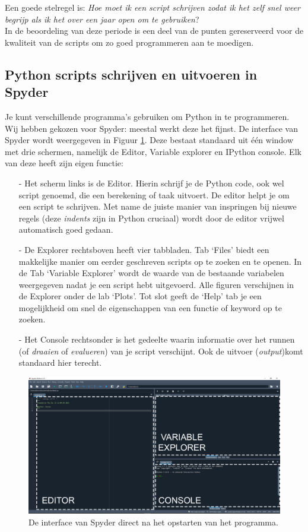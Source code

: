 \documentclass[a4paper,11pt, fleqn]{article}
\begin{document}
Een goede stelregel is: \textit{Hoe moet ik een script schrijven zodat ik het zelf snel weer begrijp als ik het over een jaar open om te gebruiken}? \\
In de beoordeling van deze periode is een deel van de punten gereserveerd voor de kwaliteit van de scripts om zo goed programmeren aan te moedigen.

\subsection{Python scripts schrijven en uitvoeren in Spyder}
Je kunt verschillende programma's gebruiken om Python in te programmeren. Wij hebben gekozen voor Spyder: meestal werkt deze het fijnst. De interface van Spyder wordt weergegeven in Figuur \ref{fig-spyder}. Deze bestaat standaard uit \'e\'en window met drie schermen, namelijk de Editor, Variable explorer en IPython console. Elk van deze heeft zijn eigen functie:
\begin{itemize}
\item[-] Het scherm links is de Editor. Hierin schrijf je de Python code, ook wel script genoemd, die een berekening of taak uitvoert. De editor helpt je om een script te schrijven. Met name de juiste manier van inspringen bij nieuwe regels (deze \textit{indents} zijn in Python cruciaal) wordt door de editor vrijwel automatisch goed gedaan.
\item[-] De Explorer rechtsboven heeft vier tabbladen. Tab `Files' biedt een makkelijke manier om eerder geschreven scripts op te zoeken en te openen. In de Tab `Variable Explorer' wordt de waarde van de bestaande variabelen weergegeven nadat je een script hebt uitgevoerd. Alle figuren verschijnen in de Explorer onder de lab `Plots'. Tot slot geeft de `Help' tab je een mogelijkheid om snel de eigenschappen van een functie of keyword op te zoeken.
\item[-]Het Console rechtsonder is het gedeelte waarin informatie over het runnen (of \textit{draaien} of \textit{evalueren}) van je script verschijnt. Ook de uitvoer (\textit{output})komt standaard hier terecht.
\end{itemize}

\begin{figure}[h]
\includegraphics[width=16cm]{fig/spyder_screenshot.png}
\caption{De interface van Spyder direct na het opstarten van het programma.}
\label{fig-spyder}
\end{figure}
\end{document}
